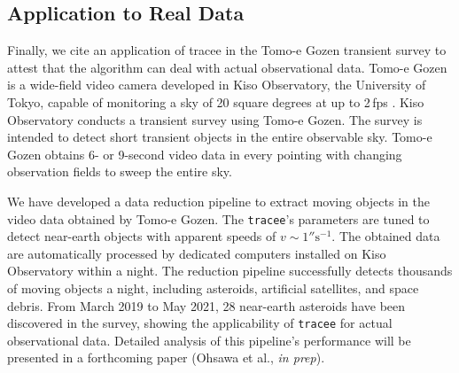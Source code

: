 \subsection{Application to Real Data}
\label{sec:performance:application}

Finally, we cite an application of tracee in the Tomo-e Gozen transient survey to attest that the algorithm can deal with actual observational data. Tomo-e Gozen is a wide-field video camera developed in Kiso Observatory, the University of Tokyo, capable of monitoring a sky of 20 square degrees at up to 2\,fps \citep{sako_tomo-e_2018}. Kiso Observatory conducts a transient survey using Tomo-e Gozen. The survey is intended to detect short transient objects in the entire observable sky. Tomo-e Gozen obtains 6- or 9-second video data in every pointing with changing observation fields to sweep the entire sky.

We have developed a data reduction pipeline to extract moving objects in the video data obtained by Tomo-e Gozen. The \texttt{tracee}'s parameters are tuned to detect near-earth objects with apparent speeds of $v \sim 1''\mathrm{s^{-1}}$. The obtained data are automatically processed by dedicated computers installed on Kiso Observatory within a night. The reduction pipeline successfully detects thousands of moving objects a night, including asteroids, artificial satellites, and space debris. From March 2019 to May 2021,  28 near-earth asteroids have been discovered in the survey, showing the applicability of \texttt{tracee} for actual observational data. Detailed analysis of this pipeline's performance will be presented in a forthcoming paper (Ohsawa et al., \textit{in prep}).


